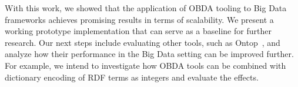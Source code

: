 With this work, we showed that the application of OBDA tooling to Big Data frameworks achieves promising results in terms of scalability.
We present a working prototype implementation that can serve as a baseline for further research.
Our next steps include evaluating other tools, such as Ontop~\cite{Calvanese2017OntopAS}, and analyze how their performance in the Big Data setting can be improved further.
For example, we intend to investigate how OBDA tools can be combined with dictionary encoding of RDF terms as integers and evaluate the effects.



%
%



%

